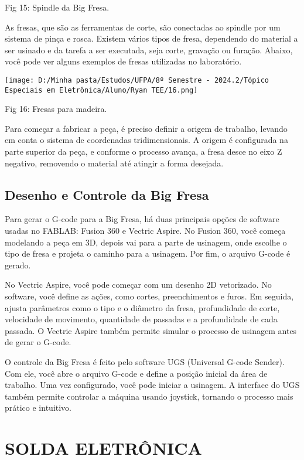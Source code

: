 \documentclass[
]{book}
\begin{document}
Fig 15: Spindle da Big Fresa.

As fresas, que são as ferramentas de corte, são conectadas ao spindle por um sistema de pinça e rosca. Existem vários tipos de fresa, dependendo do material a ser usinado e da tarefa a ser executada, seja corte, gravação ou furação. Abaixo, você pode ver alguns exemplos de fresas utilizadas no laboratório.

\texttt{[image: D:/Minha pasta/Estudos/UFPA/8º Semestre - 2024.2/Tópico Especiais em Eletrônica/Aluno/Ryan TEE/16.png]}

Fig 16: Fresas para madeira.

Para começar a fabricar a peça, é preciso definir a origem de trabalho, levando em conta o sistema de coordenadas tridimensionais. A origem é configurada na parte superior da peça, e conforme o processo avança, a fresa desce no eixo Z negativo, removendo o material até atingir a forma desejada.

\section{Desenho e Controle da Big Fresa}\label{desenho-e-controle-da-big-fresa}

Para gerar o G-code para a Big Fresa, há duas principais opções de software usadas no FABLAB: Fusion 360 e Vectric Aspire. No Fusion 360, você começa modelando a peça em 3D, depois vai para a parte de usinagem, onde escolhe o tipo de fresa e projeta o caminho para a usinagem. Por fim, o arquivo G-code é gerado.

No Vectric Aspire, você pode começar com um desenho 2D vetorizado. No software, você define as ações, como cortes, preenchimentos e furos. Em seguida, ajusta parâmetros como o tipo e o diâmetro da fresa, profundidade de corte, velocidade de movimento, quantidade de passadas e a profundidade de cada passada. O Vectric Aspire também permite simular o processo de usinagem antes de gerar o G-code.

O controle da Big Fresa é feito pelo software UGS (Universal G-code Sender). Com ele, você abre o arquivo G-code e define a posição inicial da área de trabalho. Uma vez configurado, você pode iniciar a usinagem. A interface do UGS também permite controlar a máquina usando joystick, tornando o processo mais prático e intuitivo.

\chapter{SOLDA ELETRÔNICA}\label{solda-eletruxf4nica}
\end{document}
